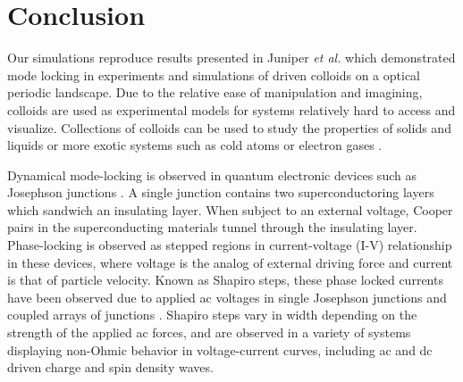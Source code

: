 \documentclass[twocolumn,preprintnumbers,amsmath,amssymb,aps,prx]{revtex4}
\begin{document}
\section{Conclusion}
\label{sec:conclusion}	%
Our simulations reproduce results presented in 
Juniper {\it et al.} \cite{Juniper2015, Juniper2018}
which demonstrated
mode locking in
experiments and simulations of 
driven colloids on a
optical periodic landscape.
Due to the relative ease of
manipulation and imagining, 
colloids are used as experimental models
for systems relatively hard to access and visualize. 
Collections of colloids can
be used to study the properties of solids and liquids
or more exotic systems 
such as cold atoms or electron gases \cite{Grier2003}.

Dynamical mode-locking
is %
observed
in quantum electronic
devices such as Josephson junctions \cite{Josephson1962,Josephson1965}.
A single junction contains 
two superconductoring layers which sandwich an insulating layer.
When subject to an external voltage,
Cooper pairs in the superconducting materials
tunnel through the insulating layer.
Phase-locking is observed as 
stepped regions in current-voltage (I-V) relationship in these devices,
where voltage is the analog of external driving force
and current is that of particle velocity.
Known as Shapiro steps, %
these phase locked currents  
have been observed due to applied ac voltages in 
single Josephson junctions \cite{Shapiro1963, Golubov2004} and
coupled arrays of junctions \cite{Benz1990}.
Shapiro steps vary in width depending on the strength of the
applied ac forces,
and are observed in a variety of systems
displaying
non-Ohmic behavior in voltage-current curves,
including
ac and dc driven
charge and spin density waves.

\end{document}
